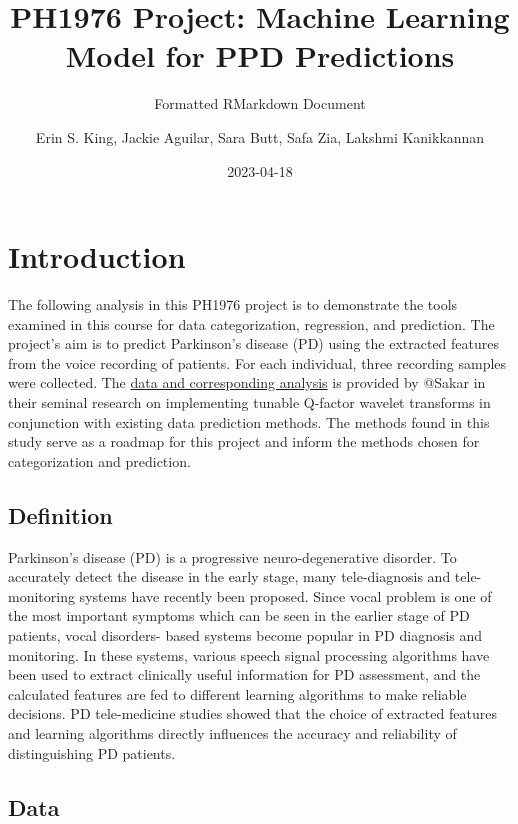 \documentclass[
]{article}
\title{PH1976 Project: Machine Learning Model for PPD Predictions}
\subtitle{Formatted RMarkdown Document}
\author{Erin S. King,
Jackie Aguilar,
Sara Butt,
Safa Zia,
Lakshmi Kanikkannan}
\date{2023-04-18}
\begin{document}
\maketitle

{
\setcounter{tocdepth}{2}
\tableofcontents
}
\hypertarget{introduction}{%
\section{Introduction}\label{introduction}}

The following analysis in this PH1976 project is to demonstrate the tools examined in this course for data categorization, regression, and prediction. The project's aim is to predict Parkinson's disease (PD) using the extracted features from the voice recording of patients. For each individual, three recording samples were collected. The \href{https://doi.org/10.1016/j.asoc.2018.10.022}{data and corresponding analysis} is provided by @Sakar in their seminal research on implementing tunable Q-factor wavelet transforms in conjunction with existing data prediction methods. The methods found in this study serve as a roadmap for this project and inform the methods chosen for categorization and prediction.

\hypertarget{definition}{%
\subsection{Definition}\label{definition}}

Parkinson's disease (PD) is a progressive neuro-degenerative disorder. To accurately detect the disease in the
early stage, many tele-diagnosis and tele-monitoring systems have recently been proposed. Since vocal problem is one of the most important symptoms which can be seen in the earlier stage of PD patients, vocal disorders-
based systems become popular in PD diagnosis and monitoring. In these systems, various speech signal processing algorithms have been used to extract clinically useful information for PD assessment, and the
calculated features are fed to different learning algorithms to make reliable decisions. PD tele-medicine studies showed that the choice of extracted features and learning algorithms directly influences the accuracy and
reliability of distinguishing PD patients.

\hypertarget{data}{%
\subsection{Data}\label{data}}
\end{document}
